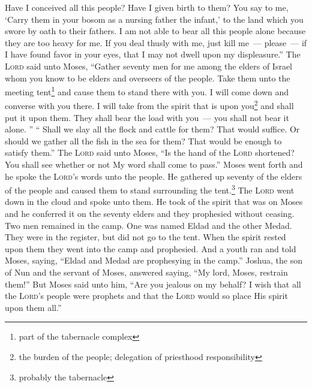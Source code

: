 \begin{enumerate}
     Have I conceived all this people? Have I given birth to them? You say to me, `Carry them in your bosom as a nursing father the infant,' to the land which you swore by oath to their fathers.%
     I am not able to bear all this people alone because they are too heavy for me.%
     If you deal thusly with me, just kill me~--- please~--- if I have found favor in your eyes, that I may not dwell upon my displeasure.''%
     The \textsc{Lord} said unto Moses, ``Gather seventy men for me among the elders of Israel whom you know to be elders and overseers of the people. Take them unto the meeting tent\footnote{part of the tabernacle complex} and cause them to stand there with you.%
     I will come down and converse with you there. I will take from the spirit that is upon you\footnote{the burden of the people; delegation of priesthood responsibility} and shall put it upon them. They shall bear the load with you~--- you shall not bear it alone.%
     ''%
     ``%
     Shall we slay all the flock and cattle for them? That would suffice. Or should we gather all the fish in the sea for them? That would be enough to satisfy them.''%
     The \textsc{Lord} said unto Moses, ``Is the hand of the \textsc{Lord} shortened? You shall see whether or not My word shall come to pass.''%
     Moses went forth and he spoke the \textsc{Lord}'s words unto the people. He gathered up seventy of the elders of the people and caused them to stand surrounding the tent.\footnote{probably the tabernacle}%
     The \textsc{Lord} went down in the cloud and spoke unto them. He took of the spirit that was on Moses and he conferred it on the seventy elders and they prophesied without ceasing.%
     Two men remained in the camp. One was named Eldad and the other Medad. They were in the register, but did not go to the tent. When the spirit rested upon them they went into the camp and prophesied.%
     And a youth ran and told Moses, saying, ``Eldad and Medad are prophesying in the camp.''%
     Joshua, the son of Nun and the servant of Moses, answered saying, ``My lord, Moses, restrain them!''%
     But Moses said unto him, ``Are you jealous on my behalf? I wish that all the \textsc{Lord}'s people were prophets and that the \textsc{Lord} would so place His spirit upon them all.''%

\end{enumerate}
